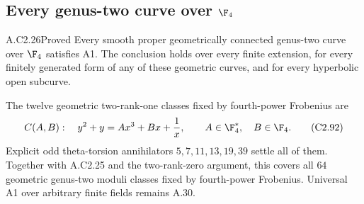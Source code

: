 \subsection{Every genus-two curve over \texorpdfstring{$\F_4$}{F4}}

\begin{claim}{A.C2.26}{Proved}
Every smooth proper geometrically connected
genus-two curve over $\F_4$ satisfies A1.
The conclusion holds over every finite
extension, for every finitely generated
form of any of these geometric curves,
and for every hyperbolic open subcurve.

The twelve geometric two-rank-one classes
fixed by fourth-power Frobenius are
\[
 C(A,B):\quad y^2+y=Ax^3+Bx+\frac1x,
 \qquad A\in\F_4^*,\quad B\in\F_4.                         \tag{C2.92}
\]
Explicit odd theta-torsion annihilators
$5,7,11,13,19,39$ settle all of them.
Together with A.C2.25 and the two-rank-zero
argument, this covers all $64$ geometric
genus-two moduli classes fixed by
fourth-power Frobenius. Universal A1
over arbitrary finite fields remains A.30.
\end{claim}
